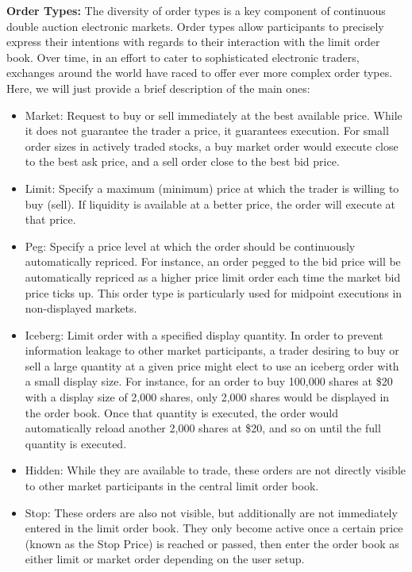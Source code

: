 \noindent\textbf{Order Types:} The diversity of order types is a key component of continuous double auction electronic markets. Order types allow participants to precisely express their intentions with regards to their interaction with the limit order book. Over time, in an effort to cater to sophisticated electronic traders, exchanges around the world have raced to offer ever more complex order types. Here, we will just provide a brief description of the main ones:
\begin{itemize}
\item  Market: Request to buy or sell immediately at the best available price. While it does not guarantee the trader a price, it guarantees execution. For small order sizes in actively traded stocks, a buy market order would execute close to the best ask price, and a sell order close to the best bid price.

\item  Limit: Specify a maximum (minimum) price at which the trader is willing to buy (sell). If liquidity is available at a better price, the order will execute at that price.

\item  Peg: Specify a price level at which the order should be continuously automatically repriced. For instance, an order pegged to the bid price will be automatically repriced as a higher price limit order each time the market bid price ticks up. This order type is particularly used for midpoint executions in non-displayed markets.

\item  Iceberg: Limit order with a specified display quantity. In order to prevent information leakage to other market participants, a trader desiring to buy or sell a large quantity at a given price might elect to use an iceberg order with a small display size. For instance, for an order to buy 100,000 shares at \$20 with a display size of 2,000 shares, only 2,000 shares would be displayed in the order book. Once that quantity is executed, the order would automatically reload another 2,000 shares at \$20, and so on until the full quantity is executed.

\item  Hidden: While they are available to trade, these orders are not directly visible to other market participants in the central limit order book. 

\item  Stop: These orders are also not visible, but additionally are not immediately entered in the limit order book. They only become active once a certain price (known as the Stop Price) is reached or passed, then enter the order book as either limit or market order depending on the user setup.


\end{itemize}
